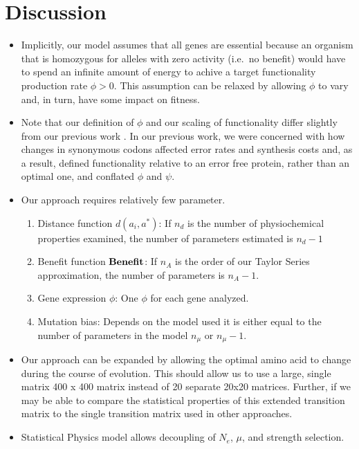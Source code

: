 \documentclass{article}
\newcommand{\Ne}{\ensuremath{{N_e}}\xspace} %
\newcommand{\aopt}{\ensuremath{a^*}\xspace}
\newcommand{\Func}{\ensuremath{\text{\textbf{Benefit}}}\xspace}
\begin{document}
\section*{Discussion}

\begin{itemize}
\item Implicitly, our model assumes that all genes are essential because an organism that is homozygous for alleles with zero activity (i.e.~no benefit) would have to spend an infinite amount of energy to achive a target functionality production rate $\phi > 0$.
This assumption can be relaxed by allowing $\phi$ to vary and, in turn, have some impact on fitness.
\item Note that our definition of $\phi$ and our scaling of functionality differ slightly from our previous work \citep{Gilchrist07,GilchristEtAl09,ShahAndGilchrist11,GilchristEtAl15a}.
In our previous work, we were concerned with how changes in synonymous codons affected error rates and synthesis costs and, as a result, defined functionality relative to an error free protein, rather than an optimal one, and conflated $\phi$ and $\psi$.
\item Our approach requires relatively few parameter. 
  \begin{enumerate}
  \item Distance function $d(a_i, \aopt)$: If $n_d$ is the number of physiochemical properties examined, the number of parameters estimated is $n_d - 1$
  \item Benefit function $\Func$: If $n_A$ is the order of our Taylor Series approximation, the number of parameters is $n_A-1$.
  \item Gene expression $\phi$: One $\phi$ for each gene analyzed.
  \item Mutation bias: Depends on the model used it is either equal to the number of parameters in the model $n_\mu$ or $n_\mu-1$.
  \end{enumerate}
\item Our approach can be expanded by allowing the optimal amino acid to change during the course of evolution.
This should allow us to use a large, single matrix 400 x 400 matrix instead of 20 separate 20x20 matrices.
Further, if we may be able to compare the statistical properties of this extended transition matrix to the single transition matrix used in other approaches.
\item Statistical Physics model allows decoupling of \Ne, $\mu$, and strength selection.
\end{itemize}


\end{document}

